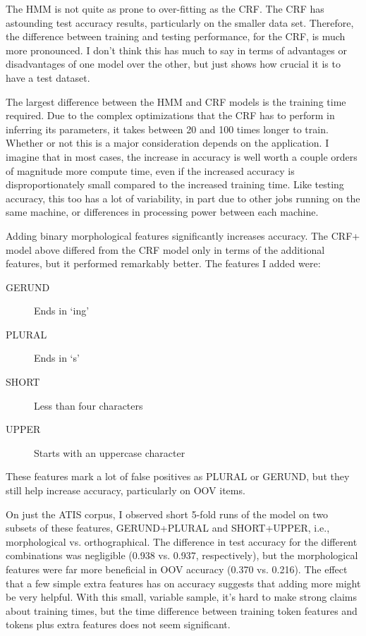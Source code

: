 \documentclass[10pt]{article}\usepackage{graphicx, color}
\begin{document}
The HMM is not quite as prone to over-fitting as the CRF. The CRF has astounding test accuracy results, particularly on the smaller data set. Therefore, the difference between training and testing performance, for the CRF, is much more pronounced. I don't think this has much to say in terms of advantages or disadvantages of one model over the other, but just shows how crucial it is to have a test dataset.

The largest difference between the HMM and CRF models is the training time required. Due to the complex optimizations that the CRF has to perform in inferring its parameters, it takes between 20 and 100 times longer to train. Whether or not this is a major consideration depends on the application. I imagine that in most cases, the increase in accuracy is well worth a couple orders of magnitude more compute time, even if the increased accuracy is disproportionately small compared to the increased training time. Like testing accuracy, this too has a lot of variability, in part due to other jobs running on the same machine, or differences in processing power between each machine.


Adding binary morphological features significantly increases accuracy. The CRF+ model above differed from the CRF model only in terms of the additional features, but it performed remarkably better. The features I added were:
\begin{description}
  \item[GERUND] Ends in `ing'
  \item[PLURAL] Ends in `s'
  \item[SHORT] Less than four characters
  \item[UPPER] Starts with an uppercase character
\end{description}
These features mark a lot of false positives as PLURAL or GERUND, but they still help increase accuracy, particularly on OOV items.

On just the ATIS corpus, I observed short 5-fold runs of the model on two subsets of these features, GERUND+PLURAL and SHORT+UPPER, i.e., morphological vs. orthographical. The difference in test accuracy for the different combinations was negligible (0.938 vs. 0.937, respectively), but the morphological features were far more beneficial in OOV accuracy (0.370 vs. 0.216). The effect that a few simple extra features has on accuracy suggests that adding more might be very helpful. With this small, variable sample, it's hard to make strong claims about training times, but the time difference between training token features and tokens plus extra features does not seem significant.
\end{document}
